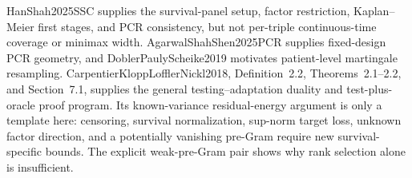 HanShah2025SSC supplies the survival-panel setup, factor restriction, Kaplan--Meier first stages, and PCR consistency, but not per-triple continuous-time coverage or minimax width.  AgarwalShahShen2025PCR supplies fixed-design PCR geometry, and DoblerPaulyScheike2019 motivates patient-level martingale resampling.  CarpentierKloppLofflerNickl2018, Definition~2.2, Theorems~2.1--2.2, and Section~7.1, supplies the general testing--adaptation duality and test-plus-oracle proof program.  Its known-variance residual-energy argument is only a template here: censoring, survival normalization, sup-norm target loss, unknown factor direction, and a potentially vanishing pre-Gram require new survival-specific bounds.  The explicit weak-pre-Gram pair shows why rank selection alone is insufficient.